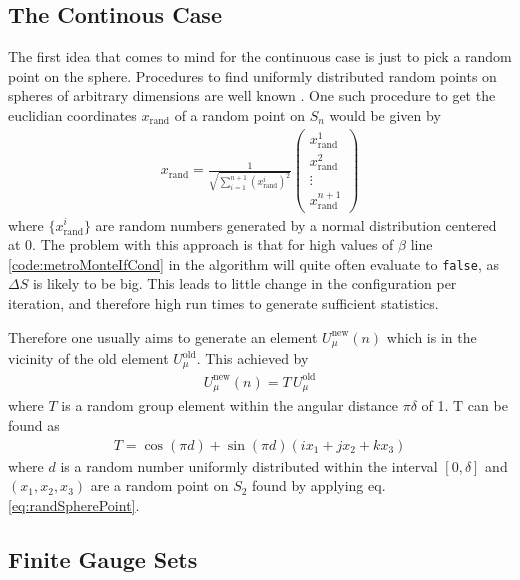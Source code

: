 \subsection{The Continous Case}
The first idea that comes to mind for the continuous case is just to pick a random point on the sphere. Procedures to find uniformly distributed random points on spheres of arbitrary dimensions are well known \cite{findsource}. One such procedure to get the euclidian coordinates $x_{\textrm{rand}}$ of a random point on $S_n$ would be given by
\begin{align}
    x_{\textrm{rand}} = \frac{1}{\sqrt{\sum_{i=1}^{n+1}(x^i_{\textrm{rand}})^2}} \begin{pmatrix}
      x^1_{\textrm{rand}} \\
      x^2_{\textrm{rand}} \\
      \vdots \\
      x^{n+1}_{\textrm{rand}}
    \end{pmatrix}
    \label{eq:randSpherePoint}
\end{align}
where $\{x^i_{\textrm{rand}}\}$ are random numbers generated by a normal distribution centered at $0$. The problem with this approach is that for high values of $\beta$ line \ref{code:metroMonteIfCond} in the algorithm will quite often evaluate to \texttt{false}, as $\Delta S$ is likely to be big. This leads to little change in the configuration per iteration, and therefore high run times to generate sufficient statistics.

Therefore one usually aims to generate an element $U_\mu^{\textrm{new}}(n)$ which is in the vicinity of the old element $U_\mu^{\textrm{old}}$. This achieved by
\begin{align*}
  U_\mu^{\textrm{new}}(n) = T \, U_\mu^{\textrm{old}}
\end{align*}
where $T$ is a random group element within the angular distance $\pi \delta$ of 1. T can be found as
\begin{align*}
T = \cos ( \pi d ) + \sin (\pi d) \left(i x_1  + j x_2  + k x_3\right)
\end{align*}
where $d$ is a random number uniformly distributed within the interval $[0,\delta]$ and $(x_1,x_2,x_3)$ are a random point on $S_2$ found by applying eq. \ref{eq:randSpherePoint}.

\subsection{Finite Gauge Sets}

